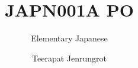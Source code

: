 \documentclass[envcountsame,envcountchap]{svmono}
\begin{document}
\begin{CJK*}{UTF8}{zhsong}

\author{Teerapat Jenrungrot}
\title{JAPN001A PO}
\subtitle{Elementary Japanese}
\maketitle

\frontmatter%




\tableofcontents


\mainmatter%
















%
%

\backmatter%


\printindex

\end{CJK*}
\end{document}
